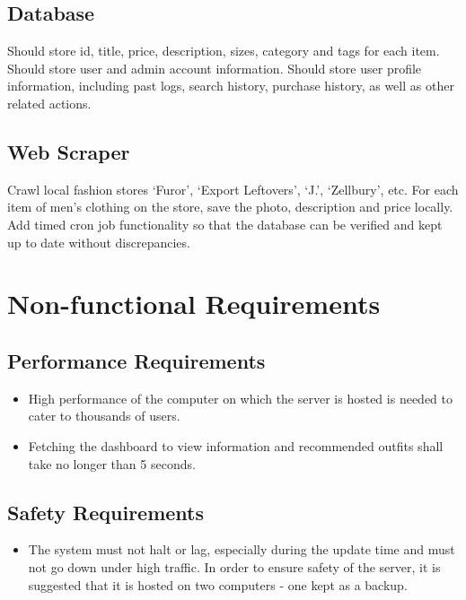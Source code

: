 \begin{outline}
  \subsection{Database}
  \1 Should store id, title, price, description, sizes, category and tags for each item.
  \1 Should store user and admin account information.
  \1 Should store user profile information, including past logs, search history, purchase history, as well as other related actions.
\end{outline}
\begin{outline}
  \subsection{Web Scraper}
  \1 Crawl local fashion stores `Furor', `Export Leftovers', `J.', `Zellbury', etc.
  \1 For each item of men's clothing on the store, save the photo, description and price locally.
  \1 Add timed cron job functionality so that the database can be verified and kept up to date without discrepancies.
\end{outline}

\section{Non-functional Requirements}

\subsection{Performance Requirements}

\begin{itemize}
    \item High performance of the computer on which the server is hosted is needed to cater to thousands of users. 
    
    \item Fetching the dashboard to view information and recommended outfits shall take no longer than 5 seconds.
\end{itemize}

\subsection{Safety Requirements}
\begin{itemize}
    \item The system must not halt or lag, especially during the update time and must not go down under high traffic. In order to ensure safety of the server, it is suggested that it is hosted on two computers - one kept as a backup.
\end{itemize}

